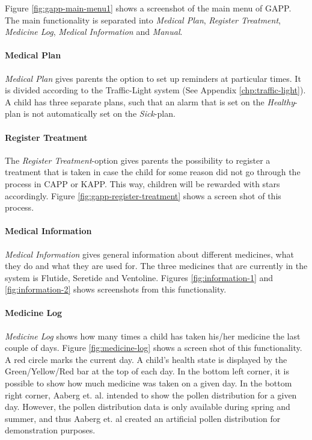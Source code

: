 Figure \ref{fig:gapp-main-menu1} shows a screenshot of the main menu of GAPP. The main functionality is separated into 
\emph{Medical Plan}, \emph{Register Treatment}, \emph{Medicine Log}, \emph{Medical Information} and \emph{Manual}. 

\paragraph{Medical Plan}
\emph{Medical Plan} gives parents the option to set up reminders at particular times. It is divided according to the Traffic-Light system (See Appendix \ref{chp:traffic-light}). A child has three separate plans, such that an alarm that is set on the \emph{Healthy}-plan is not automatically set on the \emph{Sick}-plan.   

\paragraph{Register Treatment}
The \emph{Register Treatment}-option gives parents the possibility to register a treatment that is taken in case the child for some reason did not go through the process in CAPP or KAPP. This way, children will be rewarded with stars accordingly. Figure \ref{fig:gapp-register-treatment} shows a screen shot of this process.  

\paragraph{Medical Information}
\emph{Medical Information} gives general information about different medicines, what they do and what they are used for. The three medicines that are currently in the system is Flutide, Seretide and Ventoline. Figures \ref{fig:information-1} and \ref{fig:information-2} shows screenshots from this functionality.

\paragraph{Medicine Log}
\emph{Medicine Log} shows how many times a child has taken his/her medicine the last couple of days. Figure \ref{fig:medicine-log} shows a screen shot of this functionality. A red circle marks the current day. A child's health state is displayed by the Green/Yellow/Red bar at the top of each day. In the bottom left corner, it is possible to show how much medicine was taken on a given day.
In the bottom right corner, Aaberg et. al. intended to show the pollen distribution for a given day. However, the pollen distribution data is only available during spring and summer, and thus Aaberg et. al created an artificial pollen distribution for demonstration purposes. 

